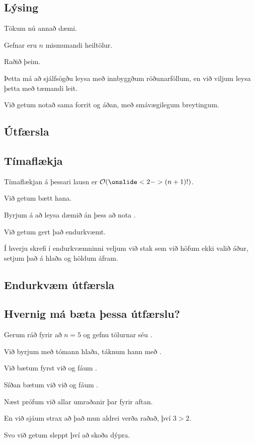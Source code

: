 \subsection{Lýsing}
{
    {
        \item<1-> Tökum nú annað dæmi.
        \item<2-> Gefnar eru $n$ mismunandi heiltölur.
        \item<3-> Raðið þeim.
        \item<4-> Þetta má að sjálfsögðu leysa með innbyggðum röðunarföllum, en við viljum leysa þetta með tæmandi leit.
        \item<5-> Við getum notað sama forrit og áðan, með smávægilegum breytingum.
    }
}

\subsection{Útfærsla}
{
}

\subsection{Tímaflækja}
{
    {
        \item<1-> Tímaflækjan á þessari lausn er $\mathcal{O}(\onslide<2->{(n + 1)!})$.
        \item<3-> Við getum bætt hana.
        \item<4-> Byrjum á að leysa dæmið án þess að nota .
        \item<5-> Við getum gert það endurkvæmt.
        \item<6-> Í hverju skrefi í endurkvæmninni veljum við stak sem við höfum ekki valið áður, setjum það á hlaða og höldum áfram.
    }
}

\subsection{Endurkvæm útfærsla}
{
}

\subsection{Hvernig má bæta þessa útfærslu?}
{
    {
        \item<1-> Gerum ráð fyrir að $n = 5$ og gefnu tölurnar séu .
        \item<2-> Við byrjum með tómann hlaða, táknum hann með .
        \item<3-> Við bætum fyrst við  og fáum .
        \item<4-> Síðan bætum við  við og fáum .
        \item<5-> Næst prófum við allar umraðanir  þar fyrir aftan.
        \item<6-> En við sjáum strax að það mun aldrei verða raðað, því $3 > 2$.
        \item<7-> Svo við getum sleppt því að skoða dýpra.
    }
}

